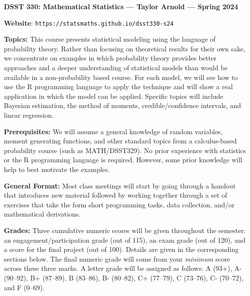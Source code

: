 \documentclass[11pt, a4paper]{article}
\begin{document}
\begin{center}
\textbf{DSST 330: Mathematical Statistics --- Taylor Arnold --- Spring 2024}
\end{center}

\vspace{0.5cm}

\textbf{Website}: \texttt{https://statsmaths.github.io/dsst330-s24}

\bigskip

\textbf{Topics:}
This course presents statistical modeling using the language of
probability theory. Rather than focusing on theoretical results for their
own sake, we concentrate on examples in which probability theory
provides better approaches and a deeper understanding of statistical
models than would be available in a non-probability based course.
For each model, we will see how to use the R programming language to
apply the technique and will show a real application in which the model
can be applied. Specific topics will include Bayesian estimation,
the method of moments, credible/confidence intervals, and linear
regression.

\bigskip

\textbf{Prerequisites:}
We will assume a general knowledge of random variables, moment generating
functions, and other standard topics from a calculus-based probability
course (such as MATH/DSST329). No prior experience with statistics or the
R programming language is required. However, some prior knowledge will help
to best motivate the examples.

\bigskip

\textbf{General Format:}
Most class meetings will start by going through a handout that
introduces new material followed by working together through a set of
exercises that take the form short programming tasks, data collection,
and/or mathematical derivations.

\bigskip

\textbf{Grades:}
Three cumulative numeric scores will be given throughout the semester:
an engagement/participation grade (out of 115), an exam grade (out of 120),
and a score for the final project (out of 100). Details are given in the
corresponding sections below. The final numeric grade will come from your
\textit{minimum} score across these three marks. A letter grade will be
assigned as follows:
             A (93+), A- (90--92),
B+ (87--89), B (83--86), B- (80--82),
C+ (77--79), C (73--76), C- (70--72), and F (0--69).

\bigskip
\end{document}
